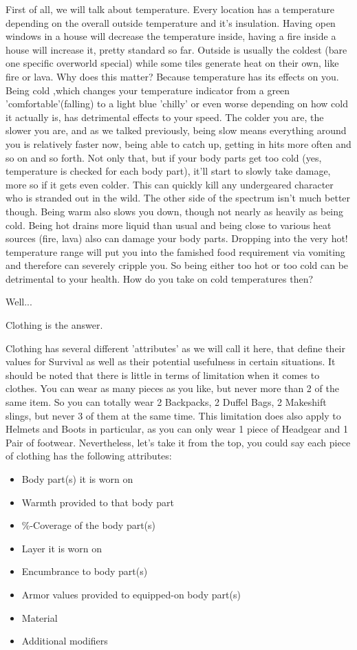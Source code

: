 \documentclass[11pt]{report}
\begin{document}
First of all, we will talk about temperature. Every location has a temperature depending on the overall outside temperature and it's insulation. Having open windows in a house will decrease the temperature inside, having a fire inside a house will increase it, pretty standard so far. Outside is usually the coldest (bare one specific overworld special) while some tiles generate heat on their own, like fire or lava. Why does this matter? Because temperature has its effects on you. Being cold ,which changes your temperature indicator from a green 'comfortable'(falling) to a light blue 'chilly' or even worse depending on how cold it actually is, has detrimental effects to your speed. The colder you are, the slower you are, and as we talked previously, being slow means everything around you is relatively faster now, being able to catch up, getting in hits more often and so on and so forth. Not only that, but if your body parts get too cold (yes, temperature is checked for each body part), it'll start to slowly take damage, more so if it gets even colder. This can quickly kill any undergeared character who is stranded out in the wild. The other side of the spectrum isn't much better though. Being warm also slows you down, though not nearly as heavily as being cold. Being hot drains more liquid than usual and being close to various heat sources (fire, lava) also can damage your body parts. Dropping into the very hot! temperature range will put you into the famished food requirement via vomiting and therefore can severely cripple you. So being either too hot or too cold can be detrimental to your health. How do you take on cold temperatures then?

Well...

Clothing is the answer.

Clothing has several different 'attributes' as we will call it here, that define their values for Survival as well as their potential usefulness in certain situations. It should be noted that there is little in terms of limitation when it comes to clothes. You can wear as many pieces as you like, but never more than 2 of the same item. So you can totally wear 2 Backpacks, 2 Duffel Bags, 2 Makeshift slings, but never 3 of them at the same time. This limitation does also apply to Helmets and Boots in particular, as you can only wear 1 piece of Headgear and 1 Pair of footwear.
Nevertheless, let's take it from the top, you could say each piece of clothing has the following attributes:
\begin{itemize}
\item Body part(s) it is worn on
\item Warmth provided to that body part
\item \%-Coverage of the body part(s)
\item Layer it is worn on
\item Encumbrance to body part(s)
\item Armor values provided to equipped-on body part(s)
\item Material
\item Additional modifiers
\end{itemize}
\end{document}
